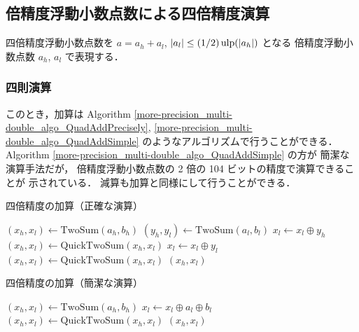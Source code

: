 \clearpage

\subsection{倍精度浮動小数点数による四倍精度演算}

四倍精度浮動小数点数を $a = a_h + a_l$, $|a_l| \le (1/2) \operatorname{ulp}(|a_h|)$ となる
倍精度浮動小数点数 $a_h$, $a_l$ で表現する．

\subsubsection{四則演算}

このとき，加算は
Algorithm \ref{more-precision_multi-double_algo_QuadAddPrecisely},
\ref{more-precision_multi-double_algo_QuadAddSimple}
のようなアルゴリズムで行うことができる．
Algorithm \ref{more-precision_multi-double_algo_QuadAddSimple} の方が
簡潔な演算手法だが，
倍精度浮動小数点数の 2 倍の 104 ビットの精度で演算できることが
示されている\cite{Naoya2012}．
減算も加算と同様にして行うことができる．

\begin{algorithm}[tp]
    \caption{四倍精度の加算（正確な演算）\cite{Hisashi2006}}
    \label{more-precision_multi-double_algo_QuadAddPrecisely}
    \begin{algorithmic}
        \State $(x_h, x_l) \gets \text{TwoSum}(a_h, b_h)$
        \State $(y_h, y_l) \gets \text{TwoSum}(a_l, b_l)$
        \State $x_l \gets x_l \oplus y_h$
        \State $(x_h, x_l) \gets \text{QuickTwoSum}(x_h, x_l)$
        \State $x_l \gets x_l \oplus y_l$
        \State $(x_h, x_l) \gets \text{QuickTwoSum}(x_h, x_l)$
        \State \Return $(x_h, x_l)$
        \EndProcedure
    \end{algorithmic}
\end{algorithm}

\begin{algorithm}[tp]
    \caption{四倍精度の加算（簡潔な演算）\cite{Naoya2012,Hirayama2014}}
    \label{more-precision_multi-double_algo_QuadAddSimple}
    \begin{algorithmic}
        \State $(x_h, x_l) \gets \text{TwoSum}(a_h, b_h)$
        \State $x_l \gets x_l \oplus a_l \oplus b_l$
        \State $(x_h, x_l) \gets \text{QuickTwoSum}(x_h, x_l)$
        \State \Return $(x_h, x_l)$
        \EndProcedure
    \end{algorithmic}
\end{algorithm}

